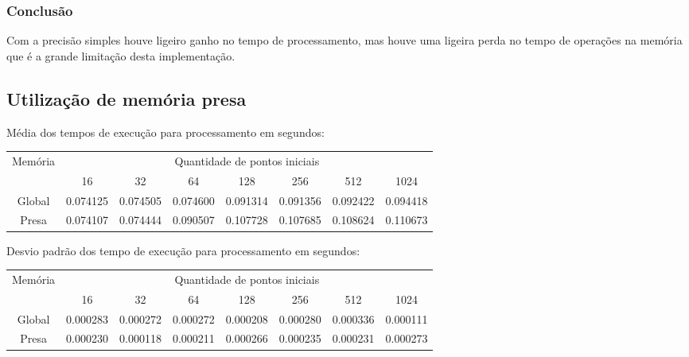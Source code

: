    \subsubsection{Conclusão}
    Com a precisão simples houve ligeiro ganho no tempo de processamento, mas houve uma ligeira perda no tempo de operações na memória que é a grande limitação desta implementação.
  
  \subsection{Utilização de memória presa}
  \begin{scriptsize}
  Média dos tempos de execução para processamento em segundos:\\
  \begin{tabular}{| c | c | c | c | c | c | c | c |}
    \hline
    \multirow{2}{*}{Memória}& \multicolumn{7}{|c|}{Quantidade de pontos iniciais} \\ \cline{2-8}
    & 16 & 32 & 64 & 128 & 256 & 512 & 1024 \\ \hline
    Global & 0.074125 & 0.074505 & 0.074600 & 0.091314 & 0.091356 & 0.092422 & 0.094418\\ \hline
    Presa & 0.074107 & 0.074444 & 0.090507 & 0.107728 & 0.107685 & 0.108624 & 0.110673\\ \hline

    \hline
  \end{tabular}
  \end{scriptsize}
  \hspace{1mm}\newline
  
  \noindent Desvio padrão dos tempo de execução para processamento em segundos:\\
  \begin{scriptsize}
  \begin{tabular}{| c | c | c | c | c | c | c | c |}
    \hline
    \multirow{2}{*}{Memória}& \multicolumn{7}{|c|}{Quantidade de pontos iniciais} \\ \cline{2-8}
    & 16 & 32 & 64 & 128 & 256 & 512 & 1024\\ \hline
    Global & 0.000283 & 0.000272 & 0.000272 & 0.000208 & 0.000280 & 0.000336 & 0.000111\\ \hline
    Presa & 0.000230 & 0.000118 & 0.000211 & 0.000266 & 0.000235 & 0.000231 & 0.000273\\ \hline

    \hline
  \end{tabular}
  \end{scriptsize}
  
